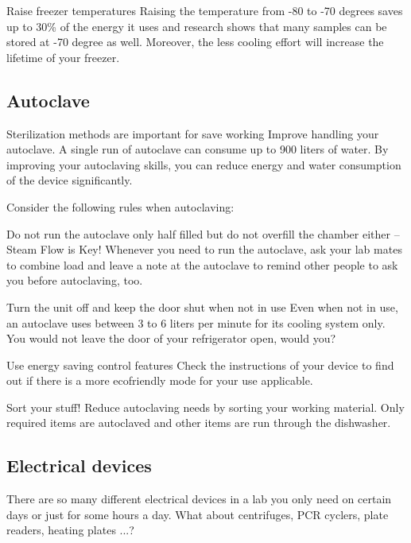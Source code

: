 \begin{suggest}{Raise freezer temperatures}
	Raising the temperature from -80 to -70 degrees saves up to 30\% of the energy it uses and research shows that many samples can be stored at -70 degree as well. Moreover, the less cooling effort will increase the lifetime of your freezer. 
\end{suggest}

\subsection{Autoclave} 
Sterilization methods are important for save working Improve handling your autoclave. A single run of autoclave can consume up to 900 liters of water. By improving your autoclaving skills, you can reduce energy and water consumption of the device significantly.
 
Consider the following rules when autoclaving:

\begin{suggest}{Do not run the autoclave only half filled but do not overfill the chamber either – Steam Flow is Key!}
	Whenever you need to run the autoclave, ask your lab mates to combine load and leave a note at the autoclave to remind other people to ask you before autoclaving, too. 

\end{suggest} 

\begin{suggest}{Turn the unit off and keep the door shut when not in use }
	Even when not in use, an autoclave uses between 3 to 6 liters per minute for its cooling system only.\\ 
	You would not leave the door of your refrigerator open, would you? 
	
\end{suggest} 

\begin{suggest}{Use energy saving control features }
	Check the instructions of your device to find out if there is a more ecofriendly mode for your use applicable.
	
\end{suggest}	

\begin{suggest}{Sort your stuff! }
	Reduce autoclaving needs by sorting your working material. Only required items are autoclaved and other items are run through the dishwasher.
\end{suggest}	

\subsection{Electrical devices}
	There are so many different electrical devices in a lab you only need on certain days or just for some hours a day. 
	What about centrifuges, PCR cyclers, plate readers, heating plates ...? 
	
